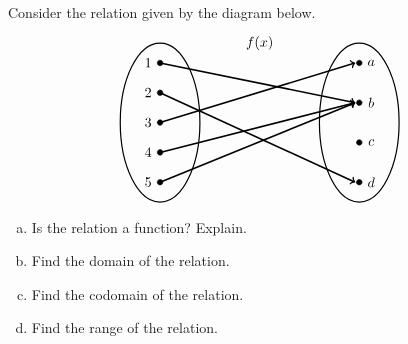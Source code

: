 \documentclass[12pt,letterpaper]{exam}
\begin{document}
\examtitle
{} 
\scores
\bottomline
\newpage


\begin{questions}

\newpage
\question[10] Consider the relation given by the diagram below.
	\[
	\begin{tikzpicture}
	\node at (2.5,2) {$f(x)$};
	
	\draw[line width=0.03cm] (0,0) circle (1 and 2);
	\draw[line width=0.03cm] (5,0) circle (1 and 2);
	
	\draw[fill=black] (0,1.5) circle (0.07);
	\draw[fill=black] (0,0.75) circle (0.07);
	\draw[fill=black] (0,0) circle (0.07);
	\draw[fill=black] (0,-0.75) circle (0.07);
	\draw[fill=black] (0,-1.5) circle (0.07);
	
	\draw[fill=black] (5,1.5) circle (0.07);
	\draw[fill=black] (5,0.50) circle (0.07);
	\draw[fill=black] (5,-0.5) circle (0.07);
	\draw[fill=black] (5,-1.5) circle (0.07);
	
	\draw[line width=0.04cm,->] (0,1.5) -- (4.9,0.50);
	\draw[line width=0.04cm,->] (0,0.75) -- (4.9,-1.5);
	\draw[line width=0.04cm,->] (0,0) -- (4.9,1.5);
	\draw[line width=0.04cm,->] (0,-1.5) -- (4.9,0.5);
	\draw[line width= 0.04cm,->,black] (0,-0.75) -- (4.9,0.5);
	
	\node at (-0.3,1.5) {$1$};
	\node at (-0.3,0.75) {$2$};
	\node at (-0.3,0) {$3$};
	\node at (-0.3,-0.75) {$4$};
	\node at (-0.3,-1.5) {$5$};
	
	\node at (5.3,1.5) {$a$};
	\node at (5.3,0.5) {$b$};
	\node at (5.3,-0.5) {$c$};
	\node at (5.3,-1.5) {$d$};
	\end{tikzpicture}
	\]

\begin{enumerate}[(a)]
\item Is the relation a function? Explain. 
\item Find the domain of the relation.
\item Find the codomain of the relation.
\item Find the range of the relation. 
\end{enumerate}




\end{questions}
\end{document}
